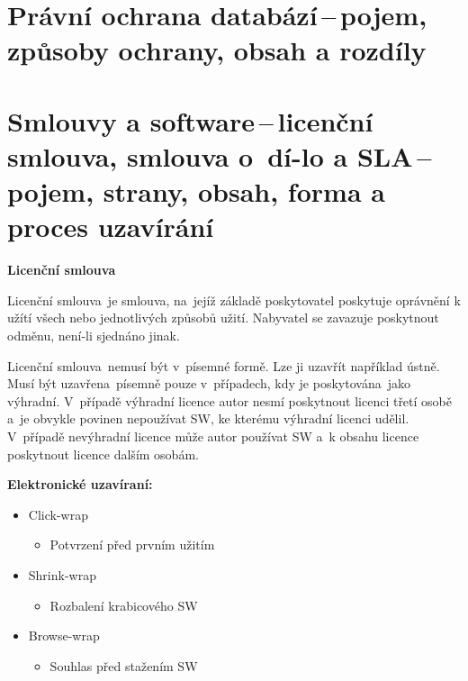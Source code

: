 \newpage
\section{Právní ochrana databází\,--\,pojem, způsoby ochrany, obsah a rozdíly}











\newpage
\section[Smlouvy a software\,--\,licenční smlouva, smlouva o~dílo a SLA\,--\,pojem, strany, obsah, forma a proces uzavírání]{Smlouvy a software\,--\,licenční smlouva, smlouva o~dí-lo a SLA\,--\,pojem, strany, obsah, forma a proces uzavírání}

\begin{Large}
\textbf{Licenční smlouva}
\end{Large} 

Licenční smlouva~je smlouva, na~jejíž základě poskytovatel poskytuje oprávnění k užítí všech nebo jednotlivých způsobů užití. Nabyvatel se zavazuje poskytnout odměnu, není-li sjednáno jinak. 

Licenční smlouva~nemusí být v~písemné formě. Lze ji uzavřít například ústně. Musí být uzavřena~písemně pouze v~případech, kdy je poskytována~jako výhradní. V~případě výhradní licence autor nesmí poskytnout licenci třetí osobě a~je obvykle povinen nepoužívat SW, ke kterému výhradní licenci udělil. V~případě nevýhradní licence může autor používat SW a~k obsahu licence poskytnout licence dalším osobám. 
\newline

\noindent\textbf{Elektronické uzavíraní:}
\begin{itemize}[noitemsep]
    \item Click-wrap
    \begin{itemize}[noitemsep]
        \item Potvrzení před prvním užitím
    \end{itemize}
    \item Shrink-wrap
    \begin{itemize}[noitemsep]
        \item Rozbalení krabicového SW
    \end{itemize}
    \item Browse-wrap
    \begin{itemize}[noitemsep]
        \item Souhlas před stažením SW
    \end{itemize}
\end{itemize}

